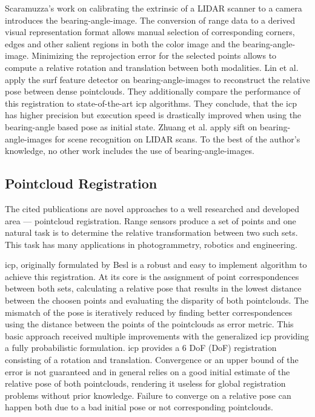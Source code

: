 Scaramuzza's work on calibrating the extrinsic of a \acrshort{LIDAR} scanner to a camera\cite{scaramuzza_iros2007} introduces the \gls{bearing-angle-image}.
The conversion of range data to a derived visual representation format allows manual selection of corresponding corners, edges and other salient regions in both the color image and the \gls{bearing-angle-image}\cite{scaramuzza_iros2007}.
Minimizing the reprojection error for the selected points allows to compute a relative rotation and translation between both modalities.
Lin et al.\cite{lin_easp2017} apply the \acrshort{surf}\cite{bay_eccv06} \gls{feature} detector on \glspl{bearing-angle-image} to reconstruct the relative pose between dense pointclouds.
They additionally compare the performance of this registration to state-of-the-art \acrshort{icp} algorithms.
They conclude, that the \acrshort{icp} has higher precision but execution speed is drastically improved when using the \gls{bearing-angle} based pose as initial state.
Zhuang et al.\cite{zhuang_iam2013} apply \acrshort{sift}\cite{lowe_ijcv04} on \glspl{bearing-angle-image} for scene recognition on \acrshort{LIDAR} scans.
To the best of the author's knowledge, no other work includes the use of \glspl{bearing-angle-image}.

\subsection{Pointcloud Registration}

The cited publications are novel approaches to a well researched and developed area --- pointcloud registration.
Range sensors produce a set of points and one natural task is to determine the relative transformation between two such sets.
This task has many applications in photogrammetry, robotics and engineering.

\acrshort{icp}, originally formulated by Besl\cite{besl_pami1992} is a robust and easy to implement algorithm to achieve this registration.
At its core is the assignment of point correspondences between both sets, calculating a relative pose that results in the lowest distance between the choosen points and evaluating the disparity of both pointclouds.
The mismatch of the pose is iteratively reduced by finding better correspondences using the distance between the points of the pointclouds as error metric.
This basic approach received multiple improvements with the generalized \acrshort{icp}\cite{segal_2009,korn_2014} providing a fully probabilistic formulation.
\acrshort{icp} provides a 6 \acrlong{DoF} (\acrshort{DoF}) registration consisting of a rotation and translation.
Convergence or an upper bound of the error is not guaranteed and in general relies on a good initial estimate of the relative pose of both pointclouds, rendering it useless for global registration problems without prior knowledge.
Failure to converge on a relative pose can happen both due to a bad initial pose or not corresponding pointclouds.

